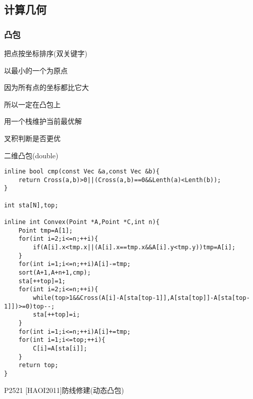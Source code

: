 \documentclass{ctexart}
\begin{document}
\begin{lstlisting}
\end{lstlisting}
\subsection{计算几何}
\subsubsection{凸包}
把点按坐标排序(双关键字)

以最小的一个为原点

因为所有点的坐标都比它大

所以一定在凸包上

用一个栈维护当前最优解

叉积判断是否更优

二维凸包(double)
\begin{lstlisting}
inline bool cmp(const Vec &a,const Vec &b){
	return Cross(a,b)>0||(Cross(a,b)==0&&Lenth(a)<Lenth(b));
}

int sta[N],top;

inline int Convex(Point *A,Point *C,int n){
	Point tmp=A[1];
	for(int i=2;i<=n;++i){
		if(A[i].x<tmp.x||(A[i].x==tmp.x&&A[i].y<tmp.y))tmp=A[i];
	}
	for(int i=1;i<=n;++i)A[i]-=tmp;
	sort(A+1,A+n+1,cmp);
	sta[++top]=1;
	for(int i=2;i<=n;++i){
		while(top>1&&Cross(A[i]-A[sta[top-1]],A[sta[top]]-A[sta[top-1]])>=0)top--;
		sta[++top]=i;
	}
	for(int i=1;i<=n;++i)A[i]+=tmp;
	for(int i=1;i<=top;++i){
		C[i]=A[sta[i]];
	}
	return top;
}

\end{lstlisting}
P2521 [HAOI2011]防线修建(动态凸包)
\end{document}
